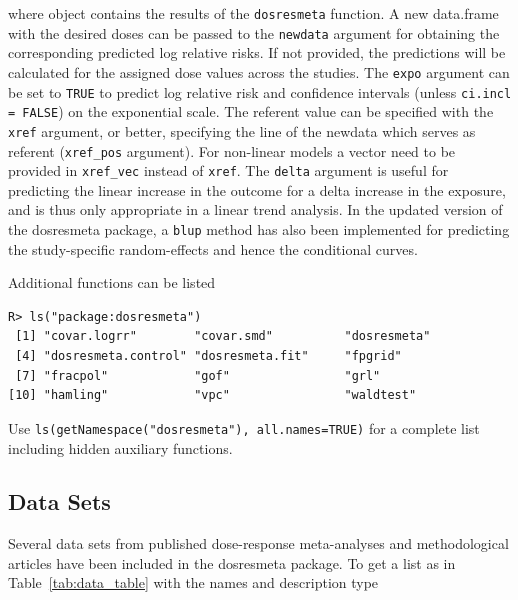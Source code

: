 \documentclass[11pt,a4paper,twoside,openany]{book}\usepackage{knitr}
\newcommand{\pkg}[1]{{\fontseries{b}\selectfont #1}}
\begin{document}
{\noindent where object contains the results of the \texttt{dosresmeta} function. A new data.frame with the desired doses can be passed to the \texttt{newdata} argument for obtaining the corresponding predicted log relative risks. If not provided, the predictions will be calculated for the assigned dose values across the studies. The \texttt{expo} argument can be set to \texttt{TRUE} to predict log relative risk and confidence intervals (unless \texttt{ci.incl = FALSE}) on the exponential scale. The referent value can be specified with the \texttt{xref} argument, or better, specifying the line of the newdata which serves as referent (\texttt{xref\_pos} argument). For non-linear models a vector need to be provided in \texttt{xref\_vec} instead of \texttt{xref}. The \texttt{delta} argument is useful for predicting the linear increase in the outcome for a delta increase in the exposure, and is thus only appropriate in a linear trend analysis. In the updated version of the \pkg{dosresmeta} package, a \texttt{blup} method has also been implemented for predicting the study-specific random-effects and hence the conditional curves.

Additional functions can be listed

\begin{knitrout}\footnotesize
{}\color{fgcolor}\begin{kframe}
\begin{verbatim}
R> ls("package:dosresmeta")
 [1] "covar.logrr"        "covar.smd"          "dosresmeta"        
 [4] "dosresmeta.control" "dosresmeta.fit"     "fpgrid"            
 [7] "fracpol"            "gof"                "grl"               
[10] "hamling"            "vpc"                "waldtest"          
\end{verbatim}
\end{kframe}
\end{knitrout}

\noindent Use \texttt{ls(getNamespace("dosresmeta"), all.names=TRUE)} for a complete list including hidden auxiliary functions.

\subsection{Data Sets}

\noindent Several data sets from published dose-response meta-analyses and methodological articles have been included in the \pkg{dosresmeta} package. To get a list as in Table~\ref{tab:data_table} with the names and description type

}
\end{document}
